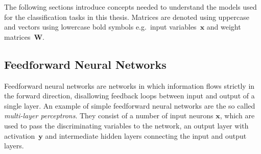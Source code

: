 The following sections introduce concepts needed to understand the models used
for the classification tasks in this thesis. Matrices are denoted using
uppercase and vectors using lowercase bold symbols e.g.\ input
variables~$\mathbf{x}$ and weight matrices~$\mathbf{W}$.

\subsection{Feedforward Neural Networks}
\label{sec:nn_feedforward}
Feedforward neural networks are networks in which information flows strictly in
the forward direction, disallowing feedback loops between input and output of a
single layer. An example of simple feedforward neural networks are the so called
\emph{multi-layer perceptrons}. They consist of a number of input neurons
$\mathbf{x}$, which are used to pass the discriminating variables to the
network, an output layer with activation~$\mathbf{y}$  and
intermediate hidden layers connecting the input and output layers.
